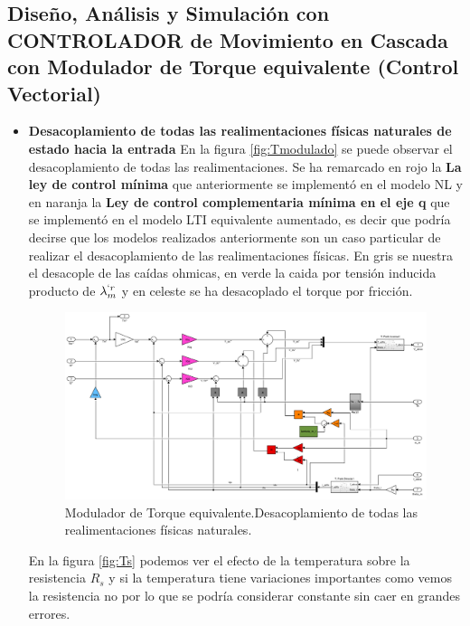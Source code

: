 \documentclass[10pt]{article}
\begin{document}
\subsection{Diseño, Análisis y Simulación con CONTROLADOR de Movimiento en Cascada con Modulador de Torque equivalente (Control Vectorial)}
\begin{itemize}
\item \textbf{Desacoplamiento de todas las realimentaciones físicas naturales de estado hacia la entrada}
	 En la figura \ref{fig:Tmodulado} se puede observar el desacoplamiento de todas las realimentaciones. Se ha remarcado en rojo la \textbf{La ley de control mínima} que anteriormente se implementó en el modelo NL y en naranja la \textbf{Ley de control complementaria mínima en el eje q}  que se implementó en el modelo LTI equivalente aumentado, es decir que podría decirse que los modelos realizados anteriormente son un caso particular de realizar el desacoplamiento de las realimentaciones físicas. En gris se nuestra el desacople de las caídas ohmicas, en verde la caida por tensión inducida producto de $\lambda^{`r}_{m}$ y en celeste se ha desacoplado el torque por fricción.

	\begin{figure}[h!]
	\centering
	\includegraphics[width=\textwidth]{modulador de torque.png}
	\caption{\label{fig:Tmodulador}Modulador de Torque equivalente.Desacoplamiento de todas las realimentaciones físicas naturales.}
	\end{figure}
	
	En la figura \ref{fig:Ts} podemos ver el efecto de la temperatura sobre la resistencia $R_{s}$ y si la temperatura tiene variaciones importantes como vemos la resistencia no por lo que se podría considerar constante sin caer en grandes errores. 
	

\end{itemize}
\end{document}
